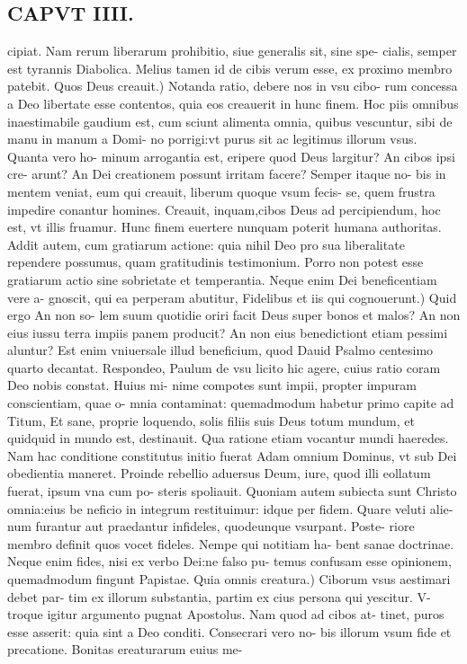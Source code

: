 \documentclass{article}
\begin{document}
\begin{pages}
\section*{CAPVT IIII. }
\marginpar{[ p.47 ]}\pstart cipiat. Nam rerum liberarum prohibitio, siue generalis sit, sine spe- cialis, semper est tyrannis Diabolica. Melius tamen id de cibis verum esse, ex proximo membro patebit.  \pend\pstart Quos Deus creauit.) Notanda ratio, debere nos in vsu cibo- rum concessa a Deo libertate esse contentos, quia eos creauerit in hunc finem. Hoc piis omnibus inaestimabile gaudium est, cum sciunt alimenta omnia, quibus vescuntur, sibi de manu in manum a Domi- no porrigi:vt purus sit ac legitimus illorum vsus. Quanta vero ho- minum arrogantia est, eripere quod Deus largitur? An cibos ipsi cre- arunt? An Dei creationem possunt irritam facere? Semper itaque no- bis in mentem veniat, eum qui creauit, liberum quoque vsum fecis- se, quem frustra impedire conantur homines. Creauit, inquam,cibos Deus ad percipiendum, hoc est, vt illis fruamur. Hunc finem euertere nunquam poterit humana authoritas. Addit autem, cum gratiarum actione: quia nihil Deo pro sua liberalitate rependere possumus, quam gratitudinis testimonium. Porro non potest esse gratiarum actio sine sobrietate et temperantia. Neque enim Dei beneficentiam vere a- gnoscit, qui ea perperam abutitur,  \pend\pstart Fidelibus et iis qui cognouerunt.) Quid ergo An non so- lem suum quotidie oriri facit Deus super bonos et malos? An non eius iussu terra impiis panem producit? An non eius benedictiont etiam pessimi aluntur? Est enim vniuersale illud beneficium, quod Dauid Psalmo centesimo quarto decantat. Respondeo, Paulum de vsu licito hic agere, cuius ratio coram Deo nobis constat. Huius mi- nime compotes sunt impii, propter impuram conscientiam, quae o- mnia contaminat: quemadmodum habetur primo capite ad Titum, Et sane, proprie loquendo, solis filiis suis Deus totum mundum, et quidquid in mundo est, destinauit. Qua ratione etiam vocantur mundi haeredes. Nam hac conditione constitutus initio fuerat Adam omnium Dominus, vt sub Dei obedientia maneret. Proinde rebellio aduersus Deum, iure, quod illi eollatum fuerat, ipsum vna cum po- steris spoliauit. Quoniam autem subiecta sunt Christo omnia:eius be neficio in integrum restituimur: idque per fidem. Quare veluti alie- num furantur aut praedantur infideles, quodeunque vsurpant. Poste- riore membro definit quos vocet fideles. Nempe qui notitiam ha- bent sanae doctrinae. Neque enim fides, nisi ex verbo Dei:ne falso pu- temus confusam esse opinionem, quemadmodum fingunt Papistae. Quia omnis creatura.) Ciborum vsus aestimari debet par- tim ex illorum substantia, partim ex cius persona qui yescitur. V- troque igitur argumento pugnat Apostolus. Nam quod ad cibos at- tinet, puros esse asserit: quia sint a Deo conditi. Consecrari vero no- bis illorum vsum fide et precatione. Bonitas ereaturarum euius me-  \pend

\end{pages}
\end{document}
